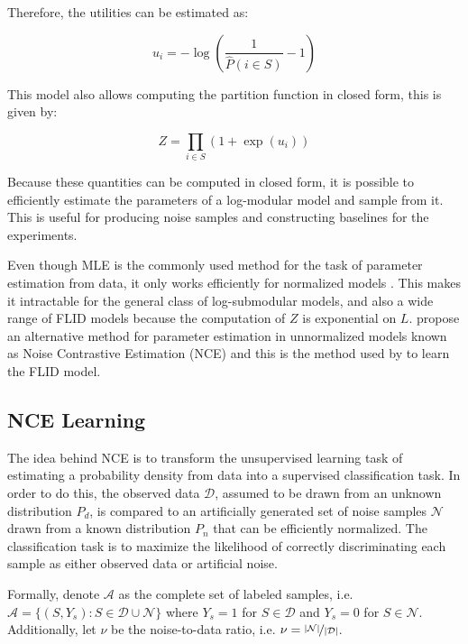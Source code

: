 Therefore, the utilities can be estimated as:

\begin{equation}
\label{eq:modular-mle}
u_{i} = -\log{\left(\frac{1}{\hat{P}(i \in S)} - 1\right)}
\end{equation}

This model also allows computing the partition function in closed form, this is given by:

\begin{equation}
\label{eq:modular-z}
Z = \prod_{i \in S}(1 + \exp(u_{i}))
\end{equation}

Because these quantities can be computed in closed form, it is possible to efficiently estimate the parameters of a log-modular model and sample from it. This is useful for producing noise samples and constructing baselines for the experiments.

Even though MLE is the commonly used method for the task of parameter estimation from data, it only works efficiently for normalized models \citep{Gutmann12NCE}. This makes it intractable for the general class of log-submodular models, and also a wide range of FLID models because the computation of $Z$ is exponential on $L$. \citet{Gutmann12NCE} propose an alternative method for parameter estimation in unnormalized models known as Noise Contrastive Estimation (NCE) and this is the method used by \citet{tschiatschek16learning} to learn the FLID model.

\subsection{NCE Learning}

The idea behind NCE is to transform the unsupervised learning task of estimating a probability density from data into a supervised classification task. In order to do this, the observed data $\mathcal{D}$, assumed to be drawn from an unknown distribution $P_{d}$, is compared to an artificially generated set of noise samples $\mathcal{N}$ drawn from a known distribution $P_{n}$ that can be efficiently normalized. The classification task is to maximize the likelihood of correctly discriminating each sample as either observed data or artificial noise.

Formally, denote $\mathcal{A}$ as the complete set of labeled samples, i.e. $\mathcal{A} = \{(S,Y_{s}) : S \in \mathcal{D} \cup \mathcal{N}\}$ where $Y_{s} = 1$ for $S \in \mathcal{D}$ and $Y_{s} = 0$ for $S \in \mathcal{N}$. Additionally, let $\nu$ be the noise-to-data ratio, i.e. $\nu = \nicefrac{|\mathcal{N}|}{|\mathcal{D}|}$.

